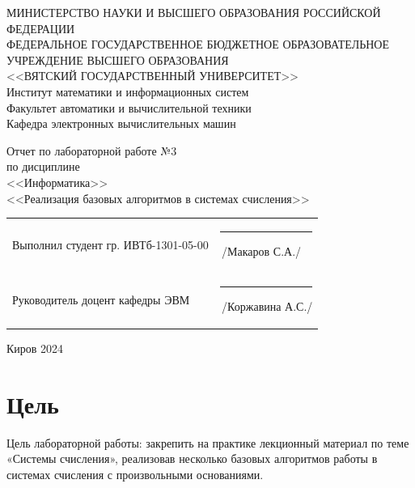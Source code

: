 \documentclass[a4paper,14pt]{extarticle}
\begin{document}
  \newpage\thispagestyle{empty}
  \begin{center}
    \MakeUppercase{
      Министерство науки и высшего образования Российской Федерации\\
      Федеральное государственное бюджетное образовательное учреждение высшего образования\\
      <<Вятский Государственный Университет>>\\
    }
    Институт математики и информационных систем\\
    Факультет автоматики и вычислительной техники\\
    Кафедра электронных вычислительных машин
  \end{center}
  \vfill

  \begin{center}
    Отчет по лабораторной работе №3\\
    по дисциплине\\
    <<Информатика>>\\
    <<Реализация базовых алгоритмов в системах счисления>>
  \end{center}
  \vfill

  \noindent
  \begin{tabular}{ll}
    Выполнил студент гр. ИВТб-1301-05-00 \hspace{5mm} &
    \rule[-1mm]{25mm}{0.10mm}\,/Макаров С.А./\\
    
    Руководитель доцент кафедры ЭВМ & \rule[-1mm]{25mm}{0.10mm}\,/Коржавина А.С./\\
  \end{tabular}

  \vfill
  \begin{center}
    Киров 2024
  \end{center}

  \newpage
  \section*{Цель}
  Цель лабораторной работы: закрепить на практике лекционный материал по теме «Системы счисления», реализовав несколько базовых алгоритмов работы в системах счисления с произвольными основаниями.
\end{document}
